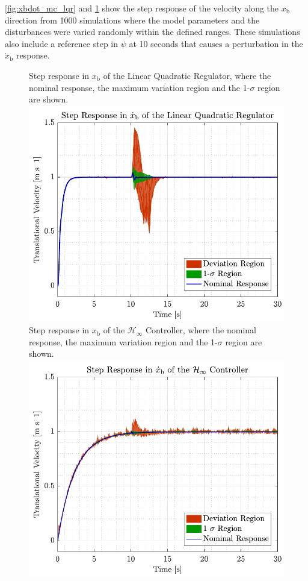 \autoref{fig:xbdot_mc_lqr} and \ref{fig:xbdot_mc_rob} show the step response of the velocity along the $x_\mathrm{b}$ direction from 1000 simulations where the model parameters and the disturbances were varied randomly within the defined ranges. These simulations also include a reference step in $\psi$ at 10 seconds that causes a perturbation in the $\dot{x}_\mathrm{b}$ response. 
\begin{figure}[H]
    \captionbox 
    {   
        Step response in $x_\mathrm{b}$ of the Linear Quadratic Regulator, where the nominal response, the maximum variation region and the 1-$\sigma$ region are shown.
        \label{fig:xbdot_mc_lqr}
    }                                                                 
    {                                                                  
        \includegraphics[width=.45\textwidth]{figures/xbdot_mc_lqr}         
    }                                                                    
    \hspace{5pt}                                                          
    \captionbox  
    {      
        Step response in $x_\mathrm{b}$ of the $\mathcal{H}_\infty$ Controller, where the nominal response, the maximum variation region and the 1-$\sigma$ region are shown.
        \label{fig:xbdot_mc_rob}
    }                                                                          
    {
        \includegraphics[width=.45\textwidth]{figures/xbdot_mc_rob}
    }
\end{figure}
